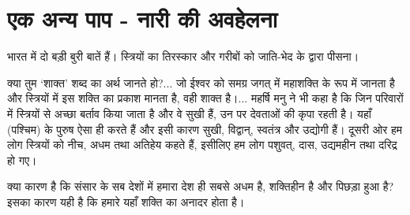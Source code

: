 \vskip 2pt


\section*{एक अन्य पाप - नारी की अवहेलना}


भारत में दो बड़ी बुरी बातें हैं। स्त्रियों का तिरस्कार और गरीबों को जाति-भेद के द्वारा पीसना। 

\vskip 3pt

क्या तुम ‘शाक्त’ शब्द का अर्थ जानते हो?... जो ईश्वर को समग्र जगत् में महाशक्ति के रूप में जानता है और स्त्रियों में इस शक्ति का प्रकाश मानता है, वही शाक्त है।... महर्षि मनु ने भी कहा है कि जिन परिवारों में स्त्रियों से अच्छा बर्ताव किया जाता है और वे सुखी हैं, उन पर देवताओं की कृपा रहती है। यहाँ (पश्चिम) के पुरुष ऐसा ही करते हैं और इसी कारण सुखी, विद्वान्, स्वतंत्र और उद्योगी हैं। दूसरी ओर हम लोग स्त्रियों को नीच, अधम तथा अतिहेय कहते हैं, इसीलिए हम लोग पशुवत्, दास, उद्यमहीन तथा दरिद्र हो गए। 

क्या कारण है कि संसार के सब देशों में हमारा देश ही सबसे अधम है, शक्तिहीन है और पिछड़ा हुआ है? इसका कारण यही है कि हमारे यहाँ शक्ति का अनादर होता है। 

\delimiter

\addtoendnotes{\protect\end{multicols}}


